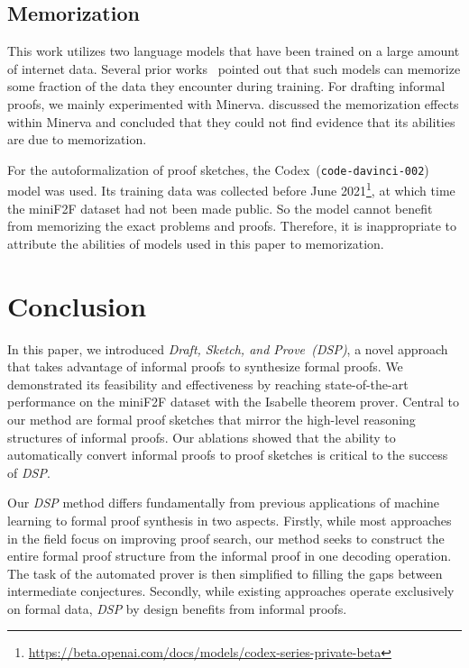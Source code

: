 \subsection{Memorization}

This work utilizes two language models that have been trained on a large amount of internet data. Several prior works~\citep{trinh2018simple, carlini2022quantifying} pointed out that such models can memorize some fraction of the data they encounter during training. For drafting informal proofs, we mainly experimented with Minerva. \citet[Section 5]{lewkowycz2022solving} discussed the memorization effects within Minerva and concluded that they could not find evidence that its abilities are due to memorization.

For the autoformalization of proof sketches, the Codex~(\texttt{code-davinci-002}) model was used. Its training data was collected before June 2021\footnote{\href{https://beta.openai.com/docs/models/codex-series-private-beta}{https://beta.openai.com/docs/models/codex-series-private-beta}}, at which time the miniF2F dataset had not been made public. So the model cannot benefit from memorizing the exact problems and proofs. Therefore, it is inappropriate to attribute the abilities of models used in this paper to memorization.

\section{Conclusion}

In this paper, we introduced \textit{Draft, Sketch, and Prove~(\textit{DSP})}, a novel approach that takes advantage of informal proofs to synthesize formal proofs. We demonstrated its feasibility and effectiveness by reaching state-of-the-art performance on the miniF2F dataset with the Isabelle theorem prover. Central to our method are formal proof sketches that mirror the high-level reasoning structures of informal proofs. Our ablations showed that the ability to automatically convert informal proofs to proof sketches is critical to the success of \textit{DSP}.

Our \textit{DSP} method differs fundamentally from previous applications of machine learning to formal proof synthesis in two aspects. Firstly, while most approaches in the field focus on improving proof search, our method seeks to construct the entire formal proof structure from the informal proof in one decoding operation. The task of the automated prover is then simplified to filling the gaps between intermediate conjectures. Secondly, while existing approaches operate exclusively on formal data, \textit{DSP} by design benefits from informal proofs.

